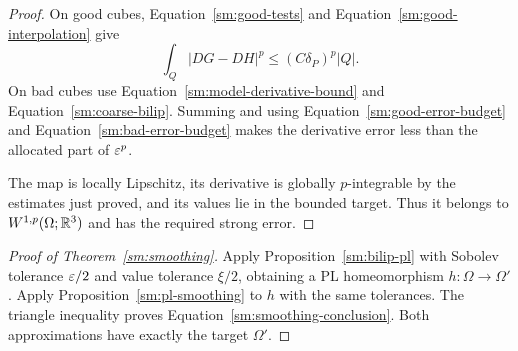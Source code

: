 \begin{proof}
On good cubes, Equation~\eqref{sm:good-tests} and
Equation~\eqref{sm:good-interpolation} give
\[
 \int_Q|DG-DH|^p\le(C\delta_P)^p|Q|.
\]
On bad cubes use
Equation~\eqref{sm:model-derivative-bound} and
Equation~\eqref{sm:coarse-bilip}.  Summing and
using Equation~\eqref{sm:good-error-budget} and
Equation~\eqref{sm:bad-error-budget} makes the
derivative error less than the allocated
part of $\varepsilon^p$.

The map is locally Lipschitz,
its derivative is globally $p$-integrable
by the estimates just proved, and its
values lie in the bounded target.
Thus it belongs to $W^{1,p}(\Omega;\mathbb R^3)$
and has the required strong error.
\end{proof}

\begin{proof}[Proof of Theorem~\ref{sm:smoothing}]
Apply Proposition~\ref{sm:bilip-pl} with
Sobolev tolerance $\varepsilon/2$ and value
tolerance $\xi/2$, obtaining a PL
homeomorphism $h:\Omega\to\Omega'$.
Apply Proposition~\ref{sm:pl-smoothing}
to $h$ with the same tolerances.
The triangle inequality proves
Equation~\eqref{sm:smoothing-conclusion}.
Both approximations have exactly the
target $\Omega'$.
\end{proof}
